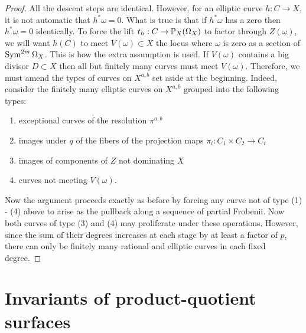 \documentclass[main.tex]{subfiles}
\begin{document}
\begin{proof}
All the descent steps are identical. However, for an elliptic curve $h : C \to X$, it is not automatic that $h^* \omega = 0$. What is true is that if $h^* \omega$ has a zero then $h^* \omega = 0$ identically. To force the lift $t_h : C \to \P_X(\Omega_X)$ to factor through $Z(\omega)$, we will want $h(C)$ to meet $V(\omega) \subset X$ the locus where $\omega$ is zero as a section of $\Sym^{2m} \Omega_X$. This is how the extra assumption is used. If $V(\omega)$ contains a big divisor $D \subset X$ then all but finitely many curves must meet $V(\omega)$. Therefore, we must amend the types of curves on $X^{a,b}$ set aside at the beginning. Indeed, consider the finitely many elliptic curves on $X^{a,b}$ grouped into the following types:
\begin{enumerate}
    \item[(1)] exceptional curves of the resolution $\pi^{a,b}$
    \item[(2)] images under $q$ of the fibers of the projection maps $\pi_i : C_1 \times C_2 \to C_i$
    \item[(3)] images of components of $Z$ not dominating $X$ 
    \item[(4)] curves not meeting $V(\omega)$.
\end{enumerate}
Now the argument proceeds exactly as before by forcing any curve not of type (1) - (4) above to arise as the pullback along a sequence of partial Frobenii. Now both curves of type (3) and (4) may proliferate under these operations. However, since the sum of their degrees increases at each stage by at least a factor of $p$, there can only be finitely many rational and elliptic curves in each fixed degree. 
\end{proof}



\section{Invariants of product-quotient surfaces}
\end{document}
